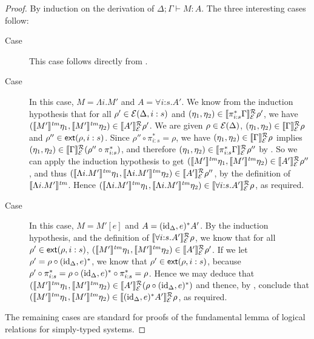\begin{proof}
  By induction on the derivation of $\Delta; \Gamma \vdash M : A$. The
  three interesting cases follow:
  \begin{description}
  \item[Case ] This case follows directly from
    .
  \item[Case ] In this case, $M = \Lambda i.M'$ and
    $A = \forall i\mathord:s. A'$. We know from the induction
    hypothesis that for all $\rho' \in \mathcal{E}(\Delta, i:s)$ and
    $(\eta_1,\eta_2) \in \llbracket \pi_{i:s}^*\Gamma \rrbracket^{\mathcal{R}}_{\mathcal{E}}{\rho'}$,
    we have $(\llbracket M' \rrbracket^{\mathit{tm}}\eta_1,\llbracket M' \rrbracket^{\mathit{tm}}\eta_2) \in
    \llbracket A' \rrbracket^{\mathcal{R}}_{\mathcal{E}}{\rho'}$. We are given $\rho \in
    \mathcal{E}(\Delta)$, $(\eta_1,\eta_2) \in
    \llbracket \Gamma \rrbracket^{\mathcal{R}}_{\mathcal{E}}{\rho}$ and $\rho'' \in
    \mathsf{ext}(\rho,i:s)$. Since $\rho'' \circ \pi^*_{i:s} = \rho$, we
    have $(\eta_1,\eta_2) \in \llbracket \Gamma \rrbracket^{\mathcal{R}}_{\mathcal{E}}{\rho}$ implies
    $(\eta_1,\eta_2) \in \llbracket \Gamma \rrbracket^{\mathcal{R}}_{\mathcal{E}}{(\rho'' \circ
      \pi^*_{i:s})}$, and therefore $(\eta_1,\eta_2) \in
    \llbracket \pi_{i:s}^*\Gamma \rrbracket^{\mathcal{R}}_{\mathcal{E}}{\rho''}$ by . So we
    can apply the induction hypothesis to get $(\llbracket M' \rrbracket^{\mathit{tm}}\eta_1,
    \llbracket M' \rrbracket^{\mathit{tm}}\eta_2) \in \llbracket A' \rrbracket^{\mathcal{R}}_{\mathcal{E}}{\rho''}$, and thus
    $(\llbracket \Lambda i.M' \rrbracket^{\mathit{tm}}\eta_1,\llbracket \Lambda i.M' \rrbracket^{\mathit{tm}}\eta_2) \in
    \llbracket A' \rrbracket^{\mathcal{R}}_{\mathcal{E}}{\rho}''$, by the definition of $\llbracket \Lambda
      i. M' \rrbracket^{\mathit{tm}}$. Hence $(\llbracket \Lambda i.M' \rrbracket^{\mathit{tm}}\eta_1,\llbracket \Lambda
      i.M' \rrbracket^{\mathit{tm}}\eta_2) \in \llbracket \forall
      i\mathord:s. A' \rrbracket^{\mathcal{R}}_{\mathcal{E}}{\rho}$, as required.
  \item[Case ] In this case, $M = M'[e]$ and $A =
    (\mathrm{id}_\Delta, e)^*A'$. By the induction hypothesis, and the
    definition of $\llbracket \forall i\mathord:s.A' \rrbracket^{\mathcal{R}}_{\mathcal{E}}{\rho}$, we
    know that for all $\rho' \in \mathsf{ext}(\rho,i:s)$,
    $(\llbracket M' \rrbracket^{\mathit{tm}}\eta_1, \llbracket M' \rrbracket^{\mathit{tm}}\eta_2) \in
    \llbracket A' \rrbracket^{\mathcal{R}}_{\mathcal{E}}{\rho'}$. If we let $\rho' = \rho \circ
    (\mathrm{id}_\Delta, e)^*$, we know that $\rho' \in \mathsf{ext}(\rho,i:s)$,
    because $\rho' \circ \pi^*_{i:s} = \rho \circ (\mathrm{id}_\Delta, e)^*
    \circ \pi^*_{i:s} = \rho$. Hence we may deduce that
    $(\llbracket M' \rrbracket^{\mathit{tm}}\eta_1,\llbracket M' \rrbracket^{\mathit{tm}}\eta_2) \in
    \llbracket A' \rrbracket^{\mathcal{R}}_{\mathcal{E}}{(\rho \circ (\mathrm{id}_\Delta,e)^*)}$ and thence,
    by , conclude that $(\llbracket M' \rrbracket^{\mathit{tm}}\eta_1,
    \llbracket M' \rrbracket^{\mathit{tm}}\eta_2) \in \llbracket (\mathrm{id}_\Delta,e)^*A' \rrbracket^{\mathcal{R}}_{\mathcal{E}}{\rho}$,
    as required.
  \end{description}
  The remaining cases are standard for proofs of the fundamental lemma
  of logical relations for simply-typed systems.
\end{proof}

